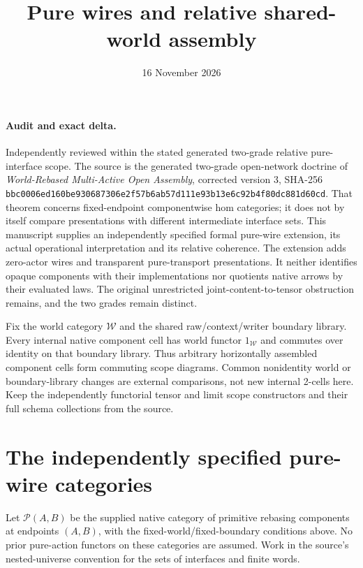 \documentclass[11pt]{article}
\title{Pure wires and relative shared-world assembly}
\date{16 November 2026}
\begin{document}
\maketitle
\paragraph{Audit and exact delta.}
Independently reviewed within the stated generated two-grade relative pure-interface scope. The source is the generated two-grade open-network doctrine of \emph{World-Rebased Multi-Active Open Assembly}, corrected version 3, SHA-256
\texttt{bbc0006ed160be930687306e2f57b6ab57d111e93b13e6c92b4f80dc881d60cd}.
That theorem concerns fixed-endpoint componentwise hom categories; it does not by itself compare presentations with different intermediate interface sets. This manuscript supplies an independently specified formal pure-wire extension, its actual operational interpretation and its relative coherence. The extension adds zero-actor wires and transparent pure-transport presentations. It neither identifies opaque components with their implementations nor quotients native arrows by their evaluated laws. The original unrestricted joint-content-to-tensor obstruction remains, and the two grades remain distinct.

Fix the world category $\mathcal W$ and the shared raw/context/writer boundary library. Every internal native component cell has world functor $1_{\mathcal W}$ and commutes over identity on that boundary library. Thus arbitrary horizontally assembled component cells form commuting scope diagrams. Common nonidentity world or boundary-library changes are external comparisons, not new internal 2-cells here. Keep the independently functorial tensor and limit scope constructors and their full schema collections from the source.

\section{The independently specified pure-wire categories}
Let $\mathcal P(A,B)$ be the supplied native category of primitive rebasing components at endpoints $(A,B)$, with the fixed-world/fixed-boundary conditions above. No prior pure-action functors on these categories are assumed. Work in the source's nested-universe convention for the sets of interfaces and finite words.
\end{document}
